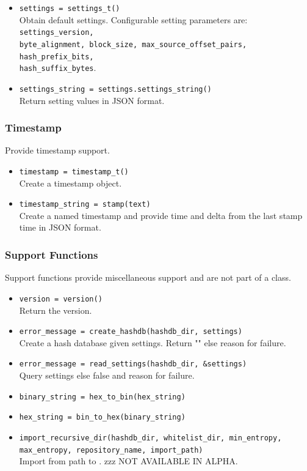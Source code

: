 \documentclass[11pt,fleqn]{article} %
\begin{document}
\begin{itemize}
\item \verb+settings = settings_t()+\\
Obtain default settings. Configurable setting parameters are: \verb+settings_version,+\\
\verb+byte_alignment, block_size, max_source_offset_pairs, hash_prefix_bits,+\\
\verb+hash_suffix_bytes+.
\item \verb+settings_string = settings.settings_string()+\\
Return setting values in JSON format.
\end{itemize}

\subsubsection{Timestamp}
Provide timestamp support.

\begin{itemize}
\item \verb+timestamp = timestamp_t()+\\
Create a timestamp object.
\item \verb+timestamp_string = stamp(text)+\\
Create a named timestamp and provide time and delta from the last stamp time in JSON format.
\end{itemize}

\subsubsection{Support Functions}
Support functions provide miscellaneous support and are not part of a class.
\begin{itemize}
\item \verb+version = version()+\\
Return the \hdb version.
\item \verb+error_message = create_hashdb(hashdb_dir, settings)+\\
Create a hash database given settings. Return "" else reason for failure.
\item \verb+error_message = read_settings(hashdb_dir, &settings)+\\
Query settings else false and reason for failure.
\item \verb+binary_string = hex_to_bin(hex_string)+
\item \verb+hex_string = bin_to_hex(binary_string)+
\item \verb+import_recursive_dir(hashdb_dir, whitelist_dir, min_entropy,+\\
\verb+max_entropy, repository_name, import_path)+\\
Import from path to \hdb. zzz NOT AVAILABLE IN ALPHA.
\end{itemize}
\end{document}
